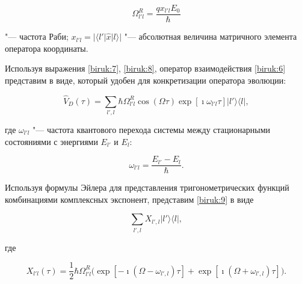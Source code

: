 \begin{equation}

\Omega_{l'l}^R=\frac{q x_{l'l} E_0}{\hbar}

\label{biruk:8}

\end{equation}

"--- частота Раби;  $x_{l'l}= |\langle l'| \hat{x} |l\rangle|$ "--- абсолютная величина матричного элемента оператора координаты.



Используя выражения \eqref{biruk:7}, \eqref{biruk:8}, оператор взаимодействия \eqref{biruk:6}  представим  в виде, который удобен для конкретизации оператора эволюции: 

\begin{equation}

\hat{V}_D(\tau)=

\sum\limits_{l',l}\hbar \Omega_{l'l}^R \cos(\Omega \tau) \exp[{\imath} \omega_{l'l}\tau]  |l'\rangle \langle l|,

\label{biruk:9}

\end{equation}

где $\omega_{l'l}$ "--- частота квантового перехода системы между стационарными состояниями с энергиями $E_{l'}$ и $E_{l}$:

\begin{equation}

\omega_{l'l}=\frac{E_{l'}-E_{l}}{\hbar}.

\label{biruk:10}

\end{equation}







Используя формулы Эйлера для представления тригонометрических функций комбинациями комплексных экспонент, представим \eqref{biruk:9} в виде

\begin{equation}

\sum\limits_{l',l} X_{l',l}  |l'\rangle \langle l|, 

\label{biruk:11}

\end{equation}

где

\begin{equation}

X_{l'l}(\tau)= \frac{1}{2}

\hbar\Omega_{l'l}^R \bigl(\exp[-\imath(\Omega-\omega_{l',l}) \tau]+\exp[\imath (\Omega+\omega_{l',l})\tau]\bigr). 

\label{biruk:12}

\end{equation}



